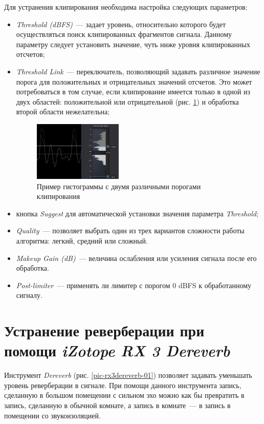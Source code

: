 \documentclass[oneside, final, 14pt]{extreport}
\begin{document}
Для устранения клипирования необходима настройка следующих параметров:
\begin{itemize}
  \item \emph{Threshold (dBFS)}~--- задает уровень, относительно которого будет осуществляться поиск клипированных фрагментов сигнала. Данному параметру следует установить значение, чуть ниже уровня клипированных отсчетов;
  \item \emph{Threshold Link}~--- переключатель, позволяющий задавать различное значение порога для положительных и отрицательных значений отсчетов. Это может потребоваться в том случае, если клипирование имеется только в одной из двух областей: положительной или отрицательной (рис. \ref{pic-rx3declip-03}) и обработка второй области нежелательна;
\begin{figure}[h!]
  \centering
  \includegraphics[width=0.4\textwidth]{pic-rx3declip-03}
  \caption{Пример гистограммы с двумя различными порогами клипирования}
  \label{pic-rx3declip-03}
\end{figure}
  \item кнопка \emph{Suggest} для автоматической установки значения параметра \emph{Threshold};
  \item \emph{Quality}~--- позволяет выбрать один из трех вариантов сложности работы алгоритма: легкий, средний или сложный.
  \item \emph{Makeup Gain (dB)}~--- величина ослабления или усиления сигнала после его обработка.
  \item \emph{Post-limiter}~--- применять ли лимитер с порогом 0 dBFS к обработанному сигналу.
\end{itemize}

\section{Устранение реверберации при помощи \emph{iZotope RX 3 Dereverb}}
Инструмент \emph{Dereverb} (рис. \ref{pic-rx3dereverb-01}) позволяет задавать уменьшать уровень реверберации в сигнале. При помощи данного инструмента запись, сделанную в большом помещении с сильном эхо можно как бы превратить в запись, сделанную в обычной комнате, а запись в комнате~--- в запись в помещении со звукоизоляцией.
\end{document}
